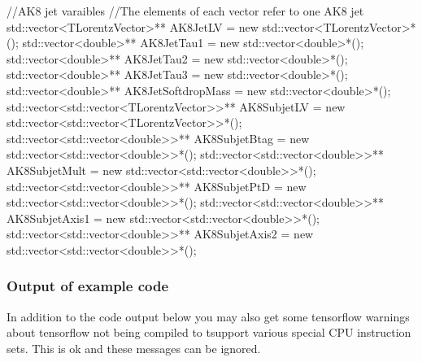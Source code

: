 \begin{DoxyCode}
\textcolor{comment}{//AK8 jet varaibles}
\textcolor{comment}{//The elements of each vector refer to one AK8 jet}
std::vector<TLorentzVector>** AK8JetLV = \textcolor{keyword}{new} std::vector<TLorentzVector>*();
std::vector<double>** AK8JetTau1 = \textcolor{keyword}{new} std::vector<double>*();
std::vector<double>** AK8JetTau2 = \textcolor{keyword}{new} std::vector<double>*();
std::vector<double>** AK8JetTau3 = \textcolor{keyword}{new} std::vector<double>*();
std::vector<double>** AK8JetSoftdropMass = \textcolor{keyword}{new} std::vector<double>*();
std::vector<std::vector<TLorentzVector>>** AK8SubjetLV = \textcolor{keyword}{new} std::vector<std::vector<TLorentzVector>>*();
std::vector<std::vector<double>>** AK8SubjetBtag  = \textcolor{keyword}{new} std::vector<std::vector<double>>*();
std::vector<std::vector<double>>** AK8SubjetMult  = \textcolor{keyword}{new} std::vector<std::vector<double>>*();
std::vector<std::vector<double>>** AK8SubjetPtD   = \textcolor{keyword}{new} std::vector<std::vector<double>>*();
std::vector<std::vector<double>>** AK8SubjetAxis1 = \textcolor{keyword}{new} std::vector<std::vector<double>>*();
std::vector<std::vector<double>>** AK8SubjetAxis2 = \textcolor{keyword}{new} std::vector<std::vector<double>>*();
\end{DoxyCode}


\subsubsection*{Output of example code}

In addition to the code output below you may also get some tensorflow warnings about tensorflow not being compiled to tsupport various special C\-P\-U instruction sets. This is ok and these messages can be ignored.


